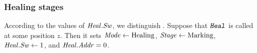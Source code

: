 \documentclass[12pt]{memoir}
\newcommand{\fld}[1]{\ensuremath{\textit{#1\/}}}
\newcommand{\rul}[1]{\ensuremath{\texttt{\slshape #1\/}}}
\newcommand{\z}{z}
\newcommand{\Addr}{\fld{Addr}}
\newcommand{\Mode}{\fld{Mode}}
\newcommand{\Heal}{\fld{Heal}}
\newcommand{\rHeal}{\rul{Heal}}
\newcommand{\Stage}{\fld{Stage}}
\newcommand{\Sweep}{\fld{Sw}}
\newcommand{\Marking}{\mathrm{Marking}}
\newcommand{\Healing}{\mathrm{Healing}}
\begin{document}
\subsubsection{Healing stages}\label{sec:rec-stages}

According to the values of \( \Heal.\Sweep \), we distinguish .
%
%
Suppose that \( \rHeal \) is called at some position \( \z \).
Then it sets  \( \Mode\gets\Healing \),  \( \Stage\gets\Marking \),
\( \Heal.\Sweep \gets 1 \), and \( \Heal.\Addr = 0 \).
\end{document}
